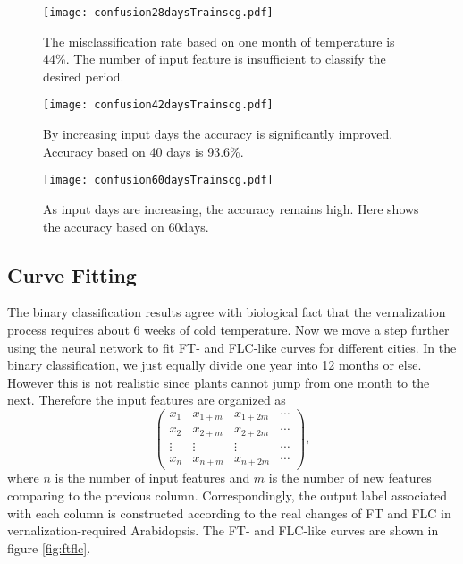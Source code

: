 \documentclass[paper=a4, fontsize=12pt]{scrartcl}	%
\numberwithin{equation}{section}					%
\numberwithin{figure}{section}					%
\numberwithin{table}{section}					%
\begin{document}
\begin{figure}[H]
\centering
\texttt{[image: confusion28daysTrainscg.pdf]}
\caption{The misclassification rate based on one month of temperature is 44\%. The number of input feature is insufficient to classify the desired period.}
\label{fig: day30}
\end{figure}

\begin{figure}[H]
\centering
\texttt{[image: confusion42daysTrainscg.pdf]}
\caption{By increasing input days the accuracy is significantly improved. Accuracy based on 40 days is 93.6\%.}
\label{fig: day40}
\end{figure}

\begin{figure}[H]
\centering
\texttt{[image: confusion60daysTrainscg.pdf]}
\caption{As input days are increasing, the accuracy remains high. Here shows the accuracy based on 60days.}
\label{fig: day60}
\end{figure}


\subsection{Curve Fitting}
The binary classification results agree with biological fact that the vernalization process requires about 6 weeks of cold temperature. Now we move a step further using the neural network to fit FT- and FLC-like curves for different cities. In the binary classification, we just equally divide one year into 12 months or else. However this is not realistic since plants cannot jump from one month to the next. Therefore the input features are organized as
\begin{equation*}
\begin{pmatrix}
x_{1} & x_{1+m} & x_{1+2m} & \cdots\\
x_{2} & x_{2+m} & x_{2+2m} & \cdots\\
\vdots & \vdots & \vdots & \cdots\\
x_n & x_{n+m} & x_{n + 2m} & \cdots
\end{pmatrix},
\end{equation*}
where $n$ is the number of input features and $m$ is the number of new features comparing to the previous column. Correspondingly, the output label associated with each column is constructed according to the real changes of FT and FLC in vernalization-required Arabidopsis. The FT- and FLC-like curves are shown in figure \ref{fig:ftflc}. 
\end{document}
